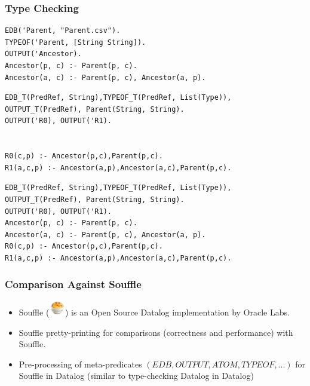 \documentclass{beamer}
\begin{document}
\begin{frame}[fragile]{}
\frametitle{Type Checking}
\vspace*{-0.2cm}
\centering{}
\begin{verbatim}
EDB('Parent, "Parent.csv").
TYPEOF('Parent, [String String]).
OUTPUT('Ancestor).
Ancestor(p, c) :- Parent(p, c).
Ancestor(a, c) :- Parent(p, c), Ancestor(a, p).
\end{verbatim}
\vspace*{-0.7cm}
\begin{center}
\end{center}
\vspace*{-0.5cm}
\begin{overprint}
\begin{verbatim}
EDB_T(PredRef, String),TYPEOF_T(PredRef, List(Type)), 
OUTPUT_T(PredRef), Parent(String, String).
OUTPUT('R0), OUTPUT('R1).


R0(c,p) :- Ancestor(p,c),Parent(p,c).
R1(a,c,p) :- Ancestor(a,p),Ancestor(a,c),Parent(p,c).
\end{verbatim}
\begin{verbatim}
EDB_T(PredRef, String),TYPEOF_T(PredRef, List(Type)), 
OUTPUT_T(PredRef), Parent(String, String).
OUTPUT('R0), OUTPUT('R1).
Ancestor(p, c) :- Parent(p, c).
Ancestor(a, c) :- Parent(p, c), Ancestor(a, p).
R0(c,p) :- Ancestor(p,c),Parent(p,c).
R1(a,c,p) :- Ancestor(a,p),Ancestor(a,c),Parent(p,c).
\end{verbatim}
\end{overprint}
\end{frame}

\begin{frame}
\frametitle{Comparison Against Souffle}
\begin{itemize}
\item<1-> Souffle (\includegraphics[width=20pt]{souffle.png}) is an Open Source Datalog implementation by Oracle Labs.
\item<2-> Souffle pretty-printing for comparisons (correctness and performance) with Souffle.
\item<3-> Pre-processing of meta-predicates $(EDB, OUTPUT, ATOM, TYPEOF, ...)$ for Souffle in Datalog (similar to type-checking Datalog in Datalog)
\end{itemize}
\end{frame}
\end{document}
